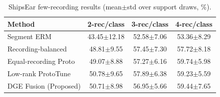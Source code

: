\begin{table}[t]
\centering
\caption{ShipsEar few-recording results (mean$\pm$std over support draws, \%).}
\begin{tabular}{lccc}
\hline
Method & 2-rec/class & 3-rec/class & 4-rec/class \\
\hline
Segment ERM & 43.45$\pm$12.18 & 52.58$\pm$7.06 & 53.36$\pm$8.29 \\
Recording-balanced & 48.81$\pm$9.55 & 57.45$\pm$7.30 & 57.72$\pm$8.18 \\
Equal-recording Proto & 49.07$\pm$8.88 & 57.27$\pm$6.16 & 59.74$\pm$5.98 \\
Low-rank ProtoTune & 50.78$\pm$9.65 & 57.89$\pm$6.38 & 59.23$\pm$5.59 \\
DGE Fusion (Proposed) & 50.71$\pm$8.98 & 56.95$\pm$5.66 & 59.44$\pm$7.65 \\
\hline
\end{tabular}
\label{tab:shipsear_final}
\end{table}
